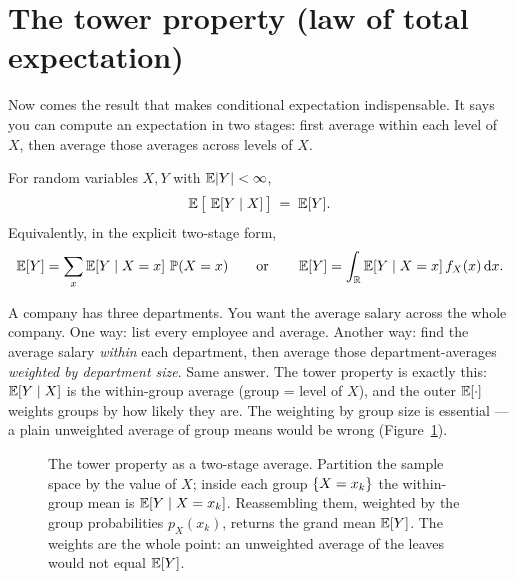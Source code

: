 \section{The tower property (law of total expectation)}
\label{ch15:tower}

Now comes the result that makes conditional expectation indispensable. It says you can compute an
expectation in two stages: first average within each level of $X$, then average those averages across
levels of $X$.

\begin{theorem}
\label{ch15:thm-tower}
For random variables $X, Y$ with $\operatorname{\mathbb{E}}\lvert Y\rvert < \infty$,
\[
  \operatorname{\mathbb{E}}\big[\,\operatorname{\mathbb{E}}[Y \mid X]\,\big] \;=\; \operatorname{\mathbb{E}}[Y].
\]
Equivalently, in the explicit two-stage form,
\[
  \operatorname{\mathbb{E}}[Y] = \sum_x \operatorname{\mathbb{E}}[Y\mid X = x]\,\operatorname{\mathbb{P}}(X=x)
  \qquad\text{or}\qquad
  \operatorname{\mathbb{E}}[Y] = \int_{\mathbb{R}} \operatorname{\mathbb{E}}[Y \mid X = x]\, f_X(x)\,\mathrm{d} x.
\]
\end{theorem}

\begin{intuitionbox}
A company has three departments. You want the average salary across the whole company. One way: list
every employee and average. Another way: find the average salary \emph{within} each department, then
average those department-averages \emph{weighted by department size}. Same answer. The tower property
is exactly this: $\operatorname{\mathbb{E}}[Y\mid X]$ is the within-group average (group = level of $X$), and the outer
$\operatorname{\mathbb{E}}[\cdot]$ weights groups by how likely they are. The weighting by group size is essential --- a plain
unweighted average of group means would be wrong (Figure~\ref{ch15:fig-tower-tree}).
\end{intuitionbox}

\begin{figure}[H]
\centering
{}
\caption{The tower property as a two-stage average. Partition the sample space by the value of $X$;
inside each group $\{X = x_k\}$ the within-group mean is $\operatorname{\mathbb{E}}[Y\mid X = x_k]$. Reassembling them,
weighted by the group probabilities $p_X(x_k)$, returns the grand mean $\operatorname{\mathbb{E}}[Y]$. The weights are the
whole point: an unweighted average of the leaves would not equal $\operatorname{\mathbb{E}}[Y]$.}
\label{ch15:fig-tower-tree}
\end{figure}

